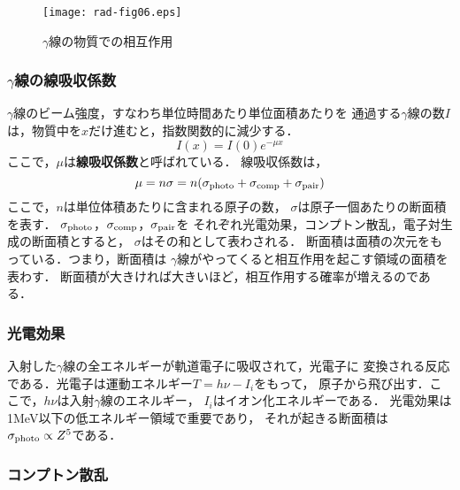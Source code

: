 \documentclass[a4j,10pt,oneside,openany]{jsbook}
\begin{document}
\begin{figure}[]
  \begin{center}
    \texttt{[image: rad-fig06.eps]}
    \caption{$\gamma$線の物質での相互作用}
    \label{fig:rad-fig06}
  \end{center}
\end{figure}

\subsubsection{$\gamma$線の線吸収係数}

$\gamma$線のビーム強度，すなわち単位時間あたり単位面積あたりを
通過する$\gamma$線の数$I$は，物質中を$x$だけ進むと，指数関数的に減少する．
\begin{equation}
  I(x) = I(0)e^{-\mu x}
  \label{eq:gamma-intensity}
\end{equation}
ここで，$\mu$は{\bf 線吸収係数}と呼ばれている．
線吸収係数は，
\begin{equation}
  \mu = n\sigma = n(\sigma_{\rm photo} + \sigma_{\rm comp}+\sigma_{\rm pair})
  \label{eq:absorption}
\end{equation}
ここで，$n$は単位体積あたりに含まれる原子の数，
$\sigma$は原子一個あたりの{\rm 断面積}を表す．
$\sigma_{\rm photo}$，$\sigma_{\rm comp}$，$\sigma_{\rm pair}$を
それぞれ光電効果，コンプトン散乱，電子対生成の断面積とすると，
$\sigma$はその和として表わされる．
断面積は面積の次元をもっている．つまり，断面積は
$\gamma$線がやってくると相互作用を起こす領域の面積を表わす．
断面積が大きければ大きいほど，相互作用する確率が増えるのである．

\subsubsection{光電効果}

入射した$\gamma$線の全エネルギーが軌道電子に吸収されて，光電子に
変換される反応である．光電子は運動エネルギー$T=h\nu - I_i$をもって，
原子から飛び出す．ここで，$h\nu$は入射$\gamma$線のエネルギー，
$I_i$はイオン化エネルギーである．
光電効果は1MeV以下の低エネルギー領域で重要であり，
それが起きる断面積は$\sigma_{\rm photo} \propto Z^5$である．

\subsubsection{コンプトン散乱}
\end{document}
